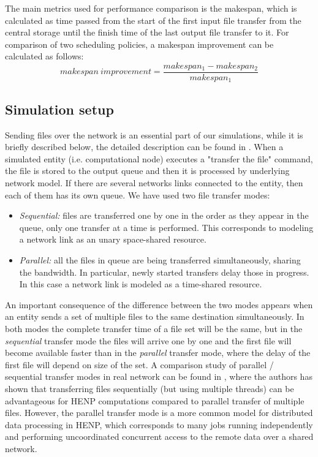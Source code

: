 \documentclass{svjour3}                     %
\begin{document}
The main metrics used for performance comparison is the makespan, which is calculated as time passed from the start of the first input file transfer from the central storage until the finish time of the last output file transfer to it. For comparison of two scheduling policies, a makespan improvement can be calculated as follows:
\begin{equation}
\label{makespanImprovement}
 makespan~improvement = \frac{makespan_{1} - makespan_{2}}{makespan_{1}} 
\end{equation}


\subsection{Simulation setup}

Sending files over the network is an essential part of our simulations, while it is briefly described below, the detailed description can be found in \cite{GridSimNetwork}. When a simulated entity (i.e. computational node) executes a "transfer the file" command, the file is stored to the output queue and then it is processed by underlying network model. If there are several networks links connected to the entity, then each of them has its own queue. We have used two file transfer modes:
\begin{itemize}
\item \textit{Sequential:} files are transferred one by one in the order as they appear in the queue, only one transfer at a time is performed. This corresponds to modeling a network link as an unary space-shared resource.
\item \textit{Parallel:} all the files in queue are being transferred simultaneously, sharing the bandwidth.  In particular, newly started transfers delay those in progress. In this case a network link is modeled as a time-shared resource.
\end{itemize}
An important consequence of the difference between the two modes appears when an entity sends a set of multiple files to the same destination simultaneously. In both modes the complete transfer time of a file set will be the same, but in the \textit{sequential} transfer mode the files will arrive one by one and the first file will become available faster than in the \textit{parallel} transfer mode, where the delay of the first file will depend on size of the set. A comparison study of parallel / sequential transfer modes in real network can be found in \cite{Zerola}, where the authors has shown that transferring files sequentially (but using multiple threads) can be advantageous for HENP computations compared to parallel transfer of multiple files. However, the parallel transfer mode is a more common model for distributed data processing in HENP, which corresponds to many jobs running independently and performing uncoordinated concurrent access to the remote data over a shared network.
\end{document}
